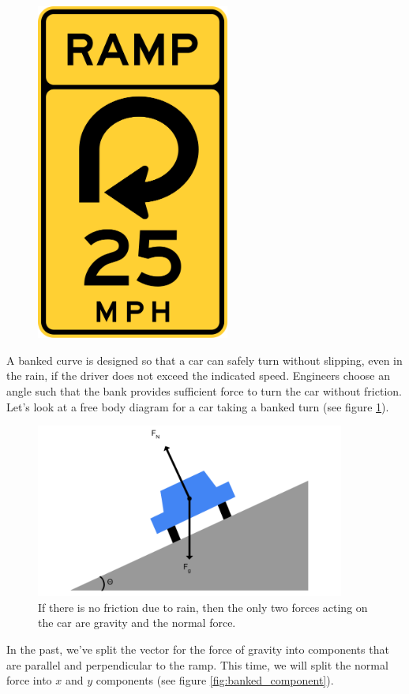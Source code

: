 \begin{figure}
\includegraphics[width=2.5in]{traffic.png}
\end{figure}

A banked curve is designed so that a car can safely turn without slipping, even in the rain, if the driver does not exceed the indicated speed. Engineers choose an angle such that the bank provides sufficient force to turn the car without friction. Let's look at a free body diagram for a car taking a banked turn (see figure \ref{fig:banked}). 

\begin{figure}[htbp]
    \centering
    \includegraphics[width=4in]{banked.png}
    \caption{If there is no friction due to rain, then the only two forces acting on the car are gravity and the normal force.}
    \label{fig:banked}
\end{figure}

In the past, we've split the vector for the force of gravity into components that are parallel and perpendicular to the ramp. This time, we will split the normal force into $x$ and $y$ components (see figure \ref{fig:banked_component}). 

